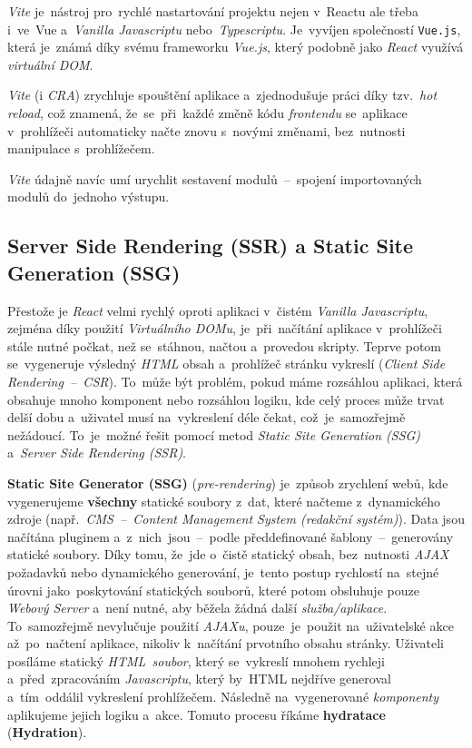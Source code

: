 \documentclass[10pt,a4paper]{article}
\begin{document}
            \emph{Vite} je~nástroj pro~rychlé nastartování projektu nejen v~Reactu ale třeba i~ve~Vue a~\emph{Vanilla Javascriptu} nebo~\emph{Typescriptu}. Je~vyvíjen společností \texttt{Vue.js}, která je~známá díky svému frameworku \emph{Vue.js}, který podobně jako \emph{React} využívá \emph{virtuální DOM}.

            \emph{Vite} (i \emph{CRA}) zrychluje spouštění aplikace a~zjednodušuje práci díky tzv.~\emph{hot reload}, což znamená, že~se~při~každé změně kódu \emph{frontendu} se~aplikace v~prohlížeči automaticky načte znovu s~novými změnami, bez~nutnosti manipulace s~prohlížečem.

            \emph{Vite} údajně navíc umí urychlit sestavení modulů~--~spojení importovaných modulů do~jednoho výstupu.\cite{vitejs}

        \subsection{Server Side Rendering (SSR) a Static Site Generation (SSG)}
            Přestože je \emph{React} velmi rychlý oproti aplikaci v~čistém \emph{Vanilla Javascriptu}, zejména díky použití \emph{Virtuálního DOMu}, je~při~načítání aplikace v~prohlížeči stále nutné počkat, než se~stáhnou, načtou a~provedou skripty. Teprve potom se~vygeneruje výsledný \emph{HTML} obsah a~prohlížeč stránku vykreslí (\emph{Client Side Rendering~--~CSR})\cite{mediumWhatCSR}. To~může být problém, pokud máme rozsáhlou aplikaci, která obsahuje mnoho komponent nebo rozsáhlou logiku, kde celý proces může trvat delší dobu a~uživatel musí na~vykreslení déle čekat, což~je~samozřejmě nežádoucí. To~je~možné řešit pomocí metod \emph{Static Site Generation (SSG)} a~\emph{Server Side Rendering (SSR)}.

            \textbf{Static Site Generator (SSG)} (\emph{pre-rendering}) je~způsob zrychlení webů, kde vygenerujeme \textbf{všechny} statické soubory z~dat, které načteme z~dynamického zdroje (např.~\emph{CMS~--~Content Management System (redakční systém)}). Data jsou načítána pluginem a~z~nich~jsou~--~podle předdefinované šablony~--~generovány statické soubory. Díky tomu, že~jde o~čistě statický obsah, bez~nutnosti \emph{AJAX} požadavků nebo dynamického generování, je~tento postup rychlostí na~stejné úrovni jako~poskytování statických souborů, které potom obsluhuje pouze \emph{Webový Server} a~není nutné, aby běžela žádná další \emph{služba/aplikace}. To~samozřejmě nevylučuje použití \emph{AJAXu}, pouze~je~použit na~uživatelské akce až~po~načtení aplikace, nikoliv k~načítání prvotního obsahu stránky. Uživateli posíláme statický \emph{HTML~soubor}, který se~vykreslí mnohem rychleji a~před~zpracováním \emph{Javascriptu}, který by~HTML nejdříve generoval a~tím~oddálil vykreslení prohlížečem. Následně na~vygenerované \emph{komponenty} aplikujeme jejich logiku a~akce. Tomuto procesu říkáme \textbf{hydratace} (\textbf{Hydration}).
\end{document}
